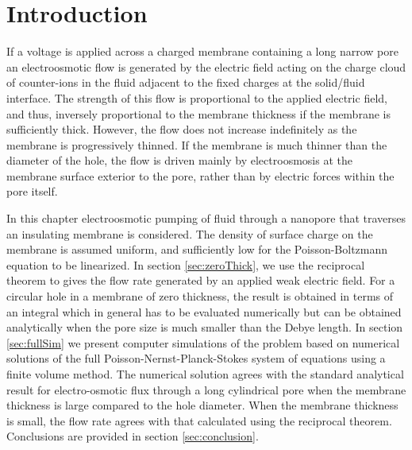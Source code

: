\newtheorem{lemma}{Lemma}
\newtheorem{corollary}{Corollary}

\section{Introduction}
\label{sec:zero_thickness_intro}
If a voltage is applied across a charged membrane containing a long narrow pore an electroosmotic flow is generated by the electric field acting on the charge cloud of counter-ions in the fluid adjacent to the fixed charges at the solid\//fluid interface. The strength of this flow is proportional to the applied electric field, and thus, inversely proportional to the membrane thickness if the membrane is sufficiently thick. However, the flow does not increase indefinitely as the membrane is progressively thinned. If the membrane is much thinner than the diameter of the hole, the flow is driven mainly by electroosmosis at the membrane surface exterior to the pore, rather than by electric forces within the pore itself. 

In this chapter electroosmotic pumping of fluid through a nanopore that traverses an insulating membrane is considered. The density of surface charge on the membrane is assumed uniform, and sufficiently low for the Poisson-Boltzmann equation to be linearized. In section \ref{sec:zeroThick}, we use the reciprocal theorem to gives the flow rate generated by an applied weak electric field. For a circular hole in a membrane of zero thickness, the result is obtained in terms of an integral which in general has to be evaluated numerically but can be obtained analytically when the pore size is much smaller than the Debye length.  In section \ref{sec:fullSim} we present computer simulations of the problem based on numerical solutions of the full Poisson-Nernst-Planck-Stokes system of equations using a finite volume method. The numerical solution agrees with the standard analytical result for electro-osmotic flux through a long cylindrical pore when the membrane thickness is large compared to the hole diameter. When the membrane thickness is small, the flow rate agrees with that calculated using the reciprocal theorem. Conclusions are provided in section \ref{sec:conclusion}. 


